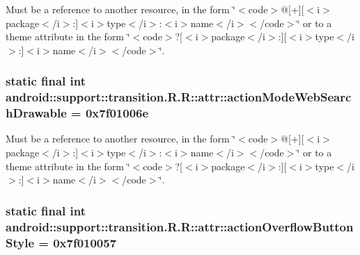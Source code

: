 Must be a reference to another resource, in the form \char`\"{}$<$code$>$@\mbox{[}+\mbox{]}\mbox{[}$<$i$>$package$<$/i$>$:\mbox{]}$<$i$>$type$<$/i$>$:$<$i$>$name$<$/i$>$$<$/code$>$\char`\"{} or to a theme attribute in the form \char`\"{}$<$code$>$?\mbox{[}$<$i$>$package$<$/i$>$:\mbox{]}\mbox{[}$<$i$>$type$<$/i$>$:\mbox{]}$<$i$>$name$<$/i$>$$<$/code$>$\char`\"{}. \hypertarget{classandroid_1_1support_1_1transition_1_1_r_1_1attr_bb7b1fba361d8a2ac916303aa9e34942}{
\subsubsection[{actionModeWebSearchDrawable}]{\setlength{\rightskip}{0pt plus 5cm}static final int android::support::transition.R.R::attr::actionModeWebSearchDrawable = 0x7f01006e}}
\label{classandroid_1_1support_1_1transition_1_1_r_1_1attr_bb7b1fba361d8a2ac916303aa9e34942}


Must be a reference to another resource, in the form \char`\"{}$<$code$>$@\mbox{[}+\mbox{]}\mbox{[}$<$i$>$package$<$/i$>$:\mbox{]}$<$i$>$type$<$/i$>$:$<$i$>$name$<$/i$>$$<$/code$>$\char`\"{} or to a theme attribute in the form \char`\"{}$<$code$>$?\mbox{[}$<$i$>$package$<$/i$>$:\mbox{]}\mbox{[}$<$i$>$type$<$/i$>$:\mbox{]}$<$i$>$name$<$/i$>$$<$/code$>$\char`\"{}. \hypertarget{classandroid_1_1support_1_1transition_1_1_r_1_1attr_27e0145b9c20d247cb46ddd239f3fcb2}{
\subsubsection[{actionOverflowButtonStyle}]{\setlength{\rightskip}{0pt plus 5cm}static final int android::support::transition.R.R::attr::actionOverflowButtonStyle = 0x7f010057}}
\label{classandroid_1_1support_1_1transition_1_1_r_1_1attr_27e0145b9c20d247cb46ddd239f3fcb2}


